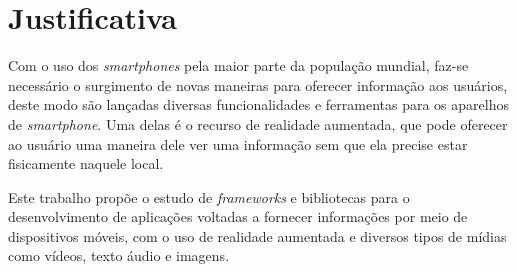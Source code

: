 \chapter{Justificativa}\label{cap:justificativa}
Com o uso dos \textit{smartphones} pela maior parte da população mundial, faz-se necessário o surgimento de novas maneiras para oferecer informação aos usuários, deste modo são lançadas diversas funcionalidades e ferramentas para os aparelhos de \textit{smartphone}. Uma delas é o recurso de realidade aumentada, que pode oferecer ao usuário uma maneira dele ver uma informação sem que ela precise estar fisicamente naquele local.

Este trabalho propõe o estudo de \textit{frameworks} e bibliotecas para o desenvolvimento de aplicações voltadas a fornecer informações por meio de dispositivos móveis, com o uso de realidade aumentada e diversos tipos de mídias como vídeos, texto áudio e imagens.